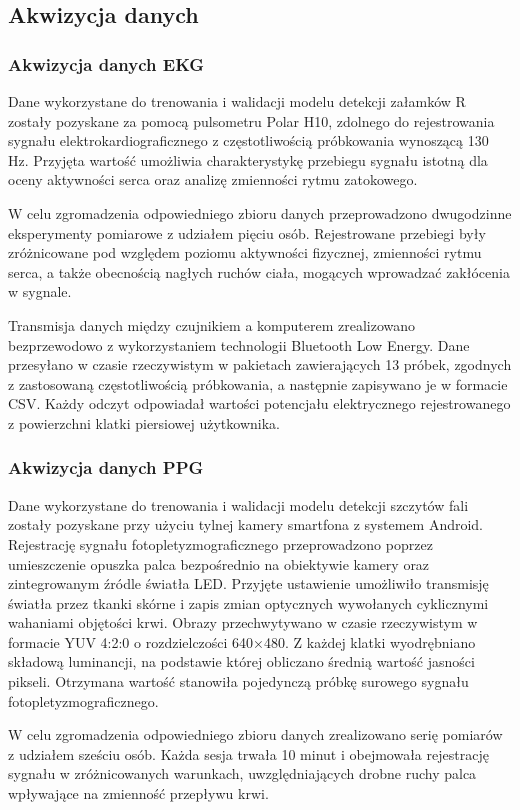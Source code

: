 \documentclass[journal]{IEEEtran}
\begin{document}
\subsection{Akwizycja danych}
\subsubsection{Akwizycja danych EKG}
Dane wykorzystane do trenowania i walidacji modelu detekcji załamków R zostały pozyskane za pomocą pulsometru Polar H10, zdolnego do rejestrowania sygnału elektrokardiograficznego z częstotliwością próbkowania wynoszącą 130 Hz. Przyjęta wartość umożliwia charakterystykę przebiegu sygnału istotną dla oceny aktywności serca oraz analizę zmienności rytmu zatokowego.

W celu zgromadzenia odpowiedniego zbioru danych przeprowadzono dwugodzinne eksperymenty pomiarowe z udziałem pięciu osób. Rejestrowane przebiegi były zróżnicowane pod względem poziomu aktywności fizycznej, zmienności rytmu serca, a także obecnością nagłych ruchów ciała, mogących wprowadzać zakłócenia w sygnale.

Transmisja danych między czujnikiem a komputerem zrealizowano bezprzewodowo z wykorzystaniem technologii Bluetooth Low Energy. Dane przesyłano w czasie rzeczywistym w pakietach zawierających 13 próbek, zgodnych z zastosowaną częstotliwością próbkowania, a następnie zapisywano je w formacie CSV. Każdy odczyt odpowiadał wartości potencjału elektrycznego rejestrowanego z powierzchni klatki piersiowej użytkownika.

\subsubsection{Akwizycja danych PPG}
Dane wykorzystane do trenowania i walidacji modelu detekcji szczytów fali zostały pozyskane przy użyciu tylnej kamery smartfona z systemem Android. Rejestrację sygnału fotopletyzmograficznego przeprowadzono poprzez umieszczenie opuszka palca bezpośrednio na obiektywie kamery oraz zintegrowanym źródle światła LED. Przyjęte ustawienie umożliwiło transmisję światła przez tkanki skórne i zapis zmian optycznych wywołanych cyklicznymi wahaniami objętości krwi. Obrazy przechwytywano w czasie rzeczywistym w formacie YUV 4:2:0 o rozdzielczości 640×480. Z każdej klatki wyodrębniano składową luminancji, na podstawie której obliczano średnią wartość jasności pikseli. Otrzymana wartość stanowiła pojedynczą próbkę surowego sygnału fotopletyzmograficznego.

W celu zgromadzenia odpowiedniego zbioru danych zrealizowano serię pomiarów z udziałem sześciu osób. Każda sesja trwała 10 minut i obejmowała rejestrację sygnału w zróżnicowanych warunkach, uwzględniających drobne ruchy palca wpływające na zmienność przepływu krwi.
\end{document}
